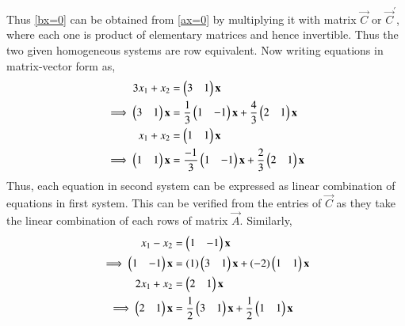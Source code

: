 \documentclass[journal,12pt,twocolumn]{IEEEtran}
\begin{document}
Thus \eqref{bx=0} can be obtained from \eqref{ax=0} by multiplying it with matrix $\vec{C}$ or $\vec{C}^{'}$, where each one is product of elementary matrices and hence invertible. 
Thus the two given homogeneous systems are row equivalent.  
Now writing equations in matrix-vector form as, 
\begin{align}
    3x_1 + x_2 &= \begin{pmatrix}3&1\end{pmatrix}\mathbf{x} \\
    \implies \begin{pmatrix}3&1\end{pmatrix}\mathbf{x} &= \frac{1}{3}\begin{pmatrix}1&-1\end{pmatrix}\mathbf{x} + \frac{4}{3}\begin{pmatrix}2&1\end{pmatrix}\mathbf{x} \label{b1}\\
    x_1 + x_2 &= \begin{pmatrix}1&1\end{pmatrix}\mathbf{x} \\
    \implies \begin{pmatrix}1&1\end{pmatrix}\mathbf{x} &= \frac{-1}{3}\begin{pmatrix}1&-1\end{pmatrix}\mathbf{x} + 
    \frac{2}{3}\begin{pmatrix}2&1\end{pmatrix}\mathbf{x} \label{b2}
\end{align}
Thus, each equation in second system can be expressed as linear combination of equations in first system. 
This can be verified from the entries of $\vec{C}$ as they take the linear combination of each rows of matrix $\vec{A}$. 
Similarly, 
\begin{align}
    x_1 - x_2 &= \begin{pmatrix}1&-1\end{pmatrix}\mathbf{x} \\
    \implies\begin{pmatrix}1&-1\end{pmatrix}\mathbf{x} &= (1)\begin{pmatrix}3&1\end{pmatrix}\mathbf{x} + (-2)\begin{pmatrix}1&1\end{pmatrix}\mathbf{x} \label{a1}\\
    2x_1 + x_2 &= \begin{pmatrix}2&1\end{pmatrix}\mathbf{x} \\
    \implies \begin{pmatrix}2&1\end{pmatrix}\mathbf{x} &= \frac{1}{2}\begin{pmatrix}3&1\end{pmatrix}\mathbf{x} + \frac{1}{2}\begin{pmatrix}1&1\end{pmatrix}\mathbf{x} \label{a2}
\end{align}
\end{document}
